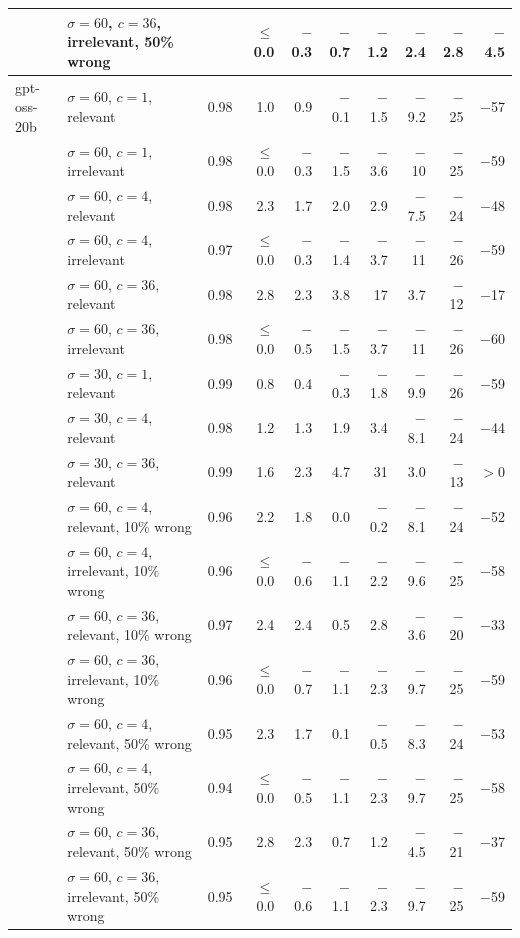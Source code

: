 \begin{tabular}{llrrrrrrrr}
 & $\sigma = 60$, $c = 36$, irrelevant, 50\% wrong &  & $\leq$ 0.0 & $-$0.3 & $-$0.7 & $-$1.2 & $-$2.4 & $-$2.8 & $-$4.5 \\
\midrule
gpt-oss-20b & $\sigma = 60$, $c = 1$, relevant & 0.98 & 1.0 & 0.9 & $-$0.1 & $-$1.5 & $-$9.2 & $-$25 & $-$57 \\
 & $\sigma = 60$, $c = 1$, irrelevant & 0.98 & $\leq$ 0.0 & $-$0.3 & $-$1.5 & $-$3.6 & $-$10 & $-$25 & $-$59 \\
 & $\sigma = 60$, $c = 4$, relevant & 0.98 & 2.3 & 1.7 & 2.0 & 2.9 & $-$7.5 & $-$24 & $-$48 \\
 & $\sigma = 60$, $c = 4$, irrelevant & 0.97 & $\leq$ 0.0 & $-$0.3 & $-$1.4 & $-$3.7 & $-$11 & $-$26 & $-$59 \\
 & $\sigma = 60$, $c = 36$, relevant & 0.98 & 2.8 & 2.3 & 3.8 & 17 & 3.7 & $-$12 & $-$17 \\
 & $\sigma = 60$, $c = 36$, irrelevant & 0.98 & $\leq$ 0.0 & $-$0.5 & $-$1.5 & $-$3.7 & $-$11 & $-$26 & $-$60 \\
 & $\sigma = 30$, $c = 1$, relevant & 0.99 & 0.8 & 0.4 & $-$0.3 & $-$1.8 & $-$9.9 & $-$26 & $-$59 \\
 & $\sigma = 30$, $c = 4$, relevant & 0.98 & 1.2 & 1.3 & 1.9 & 3.4 & $-$8.1 & $-$24 & $-$44 \\
 & $\sigma = 30$, $c = 36$, relevant & 0.99 & 1.6 & 2.3 & 4.7 & 31 & 3.0 & $-$13 & $> 0$ \\
 & $\sigma = 60$, $c = 4$, relevant, 10\% wrong & 0.96 & 2.2 & 1.8 & 0.0 & $-$0.2 & $-$8.1 & $-$24 & $-$52 \\
 & $\sigma = 60$, $c = 4$, irrelevant, 10\% wrong & 0.96 & $\leq$ 0.0 & $-$0.6 & $-$1.1 & $-$2.2 & $-$9.6 & $-$25 & $-$58 \\
 & $\sigma = 60$, $c = 36$, relevant, 10\% wrong & 0.97 & 2.4 & 2.4 & 0.5 & 2.8 & $-$3.6 & $-$20 & $-$33 \\
 & $\sigma = 60$, $c = 36$, irrelevant, 10\% wrong & 0.96 & $\leq$ 0.0 & $-$0.7 & $-$1.1 & $-$2.3 & $-$9.7 & $-$25 & $-$59 \\
 & $\sigma = 60$, $c = 4$, relevant, 50\% wrong & 0.95 & 2.3 & 1.7 & 0.1 & $-$0.5 & $-$8.3 & $-$24 & $-$53 \\
 & $\sigma = 60$, $c = 4$, irrelevant, 50\% wrong & 0.94 & $\leq$ 0.0 & $-$0.5 & $-$1.1 & $-$2.3 & $-$9.7 & $-$25 & $-$58 \\
 & $\sigma = 60$, $c = 36$, relevant, 50\% wrong & 0.95 & 2.8 & 2.3 & 0.7 & 1.2 & $-$4.5 & $-$21 & $-$37 \\
 & $\sigma = 60$, $c = 36$, irrelevant, 50\% wrong & 0.95 & $\leq$ 0.0 & $-$0.6 & $-$1.1 & $-$2.3 & $-$9.7 & $-$25 & $-$59 \\

\end{tabular}
